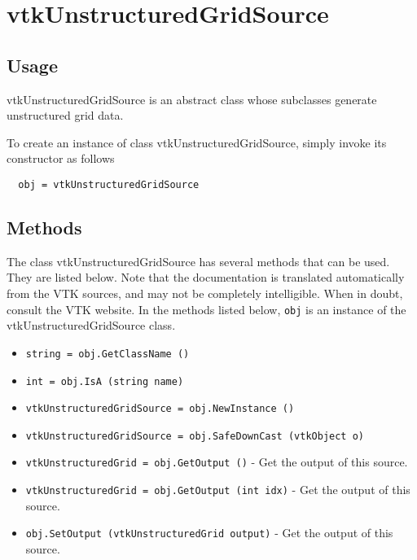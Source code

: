 \section{vtkUnstructuredGridSource}

\subsection{Usage}

 vtkUnstructuredGridSource is an abstract class whose subclasses generate 
 unstructured grid data.

To create an instance of class vtkUnstructuredGridSource, simply
invoke its constructor as follows
\begin{verbatim}
  obj = vtkUnstructuredGridSource
\end{verbatim}
\subsection{Methods}

The class vtkUnstructuredGridSource has several methods that can be used.
  They are listed below.
Note that the documentation is translated automatically from the VTK sources,
and may not be completely intelligible.  When in doubt, consult the VTK website.
In the methods listed below, \verb|obj| is an instance of the vtkUnstructuredGridSource class.
\begin{itemize}
\item  \verb|string = obj.GetClassName ()|

\item  \verb|int = obj.IsA (string name)|

\item  \verb|vtkUnstructuredGridSource = obj.NewInstance ()|

\item  \verb|vtkUnstructuredGridSource = obj.SafeDownCast (vtkObject o)|

\item  \verb|vtkUnstructuredGrid = obj.GetOutput ()| -  Get the output of this source.

\item  \verb|vtkUnstructuredGrid = obj.GetOutput (int idx)| -  Get the output of this source.

\item  \verb|obj.SetOutput (vtkUnstructuredGrid output)| -  Get the output of this source.

\end{itemize}
